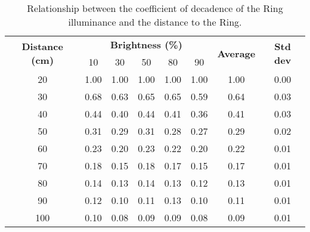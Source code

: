 \begin{table}[h!]
	\centering
	\caption{Relationship between the coefficient of decadence of the Ring illuminance and the distance to the Ring.}
	\label{table:illuminance_distance}
	\begin{tabular}{cccccccc}
		\hline
		\hline
		\toprule
		\multirow{2}{*}{\textbf{Distance (cm)}} & \multicolumn{5}{c}{\textbf{Brightness (\%)}} & \multirow{2}{*}{\textbf{Average}} & \multirow{2}{*}{\textbf{Std dev}}\\
		& 10 & 30 & 50 & 80 & 90 &&\\
		\bottomrule
		\toprule
		20    &    1.00    &    1.00    &    1.00    &    1.00    &    1.00    &    1.00    &    0.00    \\
		30    &    0.68    &    0.63    &    0.65    &    0.65    &    0.59    &    0.64    &    0.03    \\
		40    &    0.44    &    0.40    &    0.44    &    0.41    &    0.36    &    0.41    &    0.03    \\
		50    &    0.31    &    0.29    &    0.31    &    0.28    &    0.27    &    0.29    &    0.02    \\
		60    &    0.23    &    0.20    &    0.23    &    0.22    &    0.20    &    0.22    &    0.01    \\
		70    &    0.18    &    0.15    &    0.18    &    0.17    &    0.15    &    0.17    &    0.01    \\
		80    &    0.14    &    0.13    &    0.14    &    0.13    &    0.12    &    0.13    &    0.01    \\
		90    &    0.12    &    0.10    &    0.11    &    0.13    &    0.10    &    0.11    &    0.01    \\
		100    &    0.10    &    0.08    &    0.09    &    0.09    &    0.08    &    0.09    &    0.01    \\
		\bottomrule
		\hline
		\hline
	\end{tabular}
\end{table}


